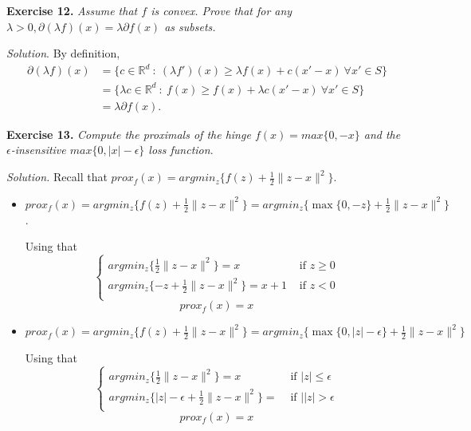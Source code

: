 \documentclass[11pt]{article}
\begin{document}
\textbf{Exercise 12. }\emph{Assume that \( f \)  is convex. Prove that for any \( \lambda > 0, \partial(\lambda f)(x) = \lambda \partial f(x) \) as subsets.}

\emph{Solution}. By definition,
\[
    \begin{aligned}
     \partial(\lambda f)(x) &= \{c \in \mathbb{R}^d \ : \ (\lambda f')(x) \geq \lambda f(x) + c(x' - x)\ \forall x' \in S\}\\
     &= \{\lambda c \in \mathbb{R}^d \ : \  f(x) \geq f(x) + \lambda c(x' - x)\ \forall x' \in S\} \\
     &= \lambda \partial f(x).
    \end{aligned}
\]


\textbf{Exercise 13. }\emph{Compute the proximals of the hinge \( f(x) = max\{0, -x\}  \) and the \( \epsilon \)-insensitive \( max\{0, |x| - \epsilon\} \) loss function}.

\emph{Solution. }Recall that \( prox_f(x) = argmin_z\{f(z) + \frac{1}{2} \|z - x\|^2 \} \).
\begin{itemize}
    \item \( prox_f(x) = argmin_z\{f(z) + \frac{1}{2} \|z - x\|^2 \} = argmin_z\{\max\{0, -z\} + \frac{1}{2} \|z - x\|^2 \} \).
    
    Using that 
        \[
             \begin{cases}
                argmin_z\{\frac{1}{2} \|z - x\|^2 \} = x &\text{ if } z \geq 0\\
                argmin_z\{-z + \frac{1}{2} \|z - x\|^2 \} = x + 1 &\text{ if } z < 0\\
             \end{cases}
        \]
        \[
             prox_f(x) = x
        \]
    \item \( prox_f(x) = argmin_z\{f(z) + \frac{1}{2} \|z - x\|^2 \} = argmin_z\{\max\{0, |z| - \epsilon\} + \frac{1}{2} \|z - x\|^2 \} \)
    
    Using that 
        \[
             \begin{cases}
                argmin_z\{\frac{1}{2} \|z - x\|^2 \} = x &\text{ if } |z| \leq \epsilon\\
                argmin_z\{|z| - \epsilon + \frac{1}{2} \|z - x\|^2 \} =  &\text{ if }   ||z| > \epsilon\\
             \end{cases}
        \]
        \[
             prox_f(x) = x
        \]

\end{itemize}
\end{document}
